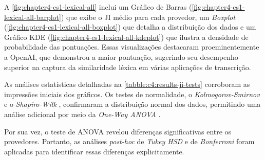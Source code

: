 A \autoref{fig:chapter4-cs1-lexical-all} inclui um Gráfico de Barras (\ref{fig:chapter4-cs1-lexical-all-barplot}) que exibe o JI médio para cada provedor, um \textit{Boxplot} (\ref{fig:chapter4-cs1-lexical-all-boxplot}) que detalha a distribuição dos dados e um Gráfico KDE (\ref{fig:chapter4-cs1-lexical-all-kdeplot}) que ilustra a densidade de probabilidade das pontuações. Essas visualizações destacaram proeminentemente a OpenAI, que demonstrou a maior pontuação, sugerindo seu desempenho superior na captura da similaridade léxica em várias aplicações de transcrição.

As análises estatísticas detalhadas na \autoref{tabble:c4:results-ji-tests} corroboram as impressões iniciais dos gráficos. Os testes de normalidade, o \textit{Kolmogorov-Smirnov} \cite{Kolmogorov1933,Smirnov1948} e o \textit{Shapiro-Wilk} \cite{Shapiro1965}, confirmaram a distribuição normal dos dados, permitindo uma análise adicional por meio da \textit{One-Way ANOVA} \cite{Fisher1925}. 

Por sua vez, o teste de ANOVA revelou diferenças significativas entre os provedores. Portanto, as análises \textit{post-hoc} de \textit{Tukey HSD} \cite{Tukey1949} e de \textit{Bonferroni} \cite{Bonferroni1936} foram aplicadas para identificar essas diferenças explicitamente. 


